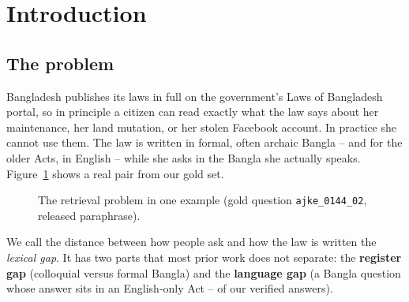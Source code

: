 \documentclass[10pt,a4paper]{article}
\newcommand{\bng}[1]{{\bn #1}}
\begin{document}
\section{Introduction}

\subsection{The problem}
Bangladesh publishes its laws in full on the government's Laws of Bangladesh portal, so in principle a citizen can read exactly what the law says about her maintenance, her land mutation, or her stolen Facebook account. In practice she cannot use them. The law is written in formal, often archaic Bangla -- and for the older Acts, in English -- while she asks in the Bangla she actually speaks. Figure~\ref{fig:gap} shows a real pair from our gold set.

\begin{figure}[H]
\centering
{}
\caption{The retrieval problem in one example (gold question \texttt{ajke\_0144\_02}, released paraphrase).}
\label{fig:gap}
\end{figure}

We call the distance between how people ask and how the law is written the \emph{lexical gap}. It has two parts that most prior work does not separate: the \textbf{register gap} (colloquial versus formal Bangla) and the \textbf{language gap} (a Bangla question whose answer sits in an English-only Act -- \pctProbeEn{} of our verified answers).
\end{document}

